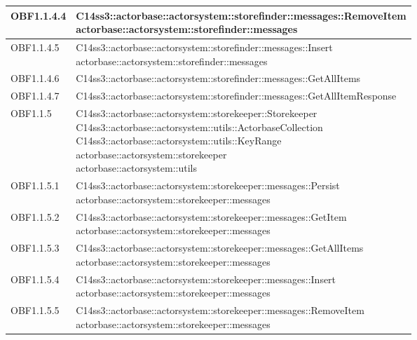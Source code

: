 \documentclass{scalatekids-article}
\begin{document}
\begin{longtable}[H]{|p{4.5cm}|p{13cm}|}
\hline
OBF1.1.4.4 & \multiLineCell[t]{C14ss3::actorbase::actorsystem::storefinder::messages::RemoveItem\\actorbase::actorsystem::storefinder::messages\\}\\
\hline
OBF1.1.4.5 & \multiLineCell[t]{C14ss3::actorbase::actorsystem::storefinder::messages::Insert\\actorbase::actorsystem::storefinder::messages\\}\\
\hline
OBF1.1.4.6 & \multiLineCell[t]{C14ss3::actorbase::actorsystem::storefinder::messages::GetAllItems\\}\\
\hline
OBF1.1.4.7 & \multiLineCell[t]{C14ss3::actorbase::actorsystem::storefinder::messages::GetAllItemResponse\\}\\
\hline
OBF1.1.5 & \multiLineCell[t]{C14ss3::actorbase::actorsystem::storekeeper::Storekeeper\\C14ss3::actorbase::actorsystem::utils::ActorbaseCollection\\C14ss3::actorbase::actorsystem::utils::KeyRange\\actorbase::actorsystem::storekeeper\\actorbase::actorsystem::utils\\}\\
\hline
OBF1.1.5.1 & \multiLineCell[t]{C14ss3::actorbase::actorsystem::storekeeper::messages::Persist\\actorbase::actorsystem::storekeeper::messages\\}\\
\hline
OBF1.1.5.2 & \multiLineCell[t]{C14ss3::actorbase::actorsystem::storekeeper::messages::GetItem\\actorbase::actorsystem::storekeeper::messages\\}\\
\hline
OBF1.1.5.3 & \multiLineCell[t]{C14ss3::actorbase::actorsystem::storekeeper::messages::GetAllItems\\actorbase::actorsystem::storekeeper::messages\\}\\
\hline
OBF1.1.5.4 & \multiLineCell[t]{C14ss3::actorbase::actorsystem::storekeeper::messages::Insert\\actorbase::actorsystem::storekeeper::messages\\}\\
\hline
OBF1.1.5.5 & \multiLineCell[t]{C14ss3::actorbase::actorsystem::storekeeper::messages::RemoveItem\\actorbase::actorsystem::storekeeper::messages\\}\\

\end{longtable}
\end{document}
